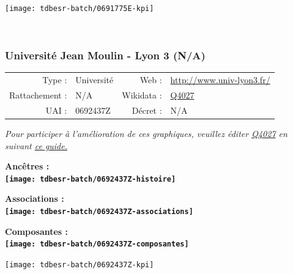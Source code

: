 \documentclass[12pt,french,]{article}
\begin{document}
\begin{center}\texttt{[image: tdbesr-batch/0691775E-kpi]} \end{center}\checkoddpage

\ifoddpage ~\newpage \fi   

\hypertarget{universituxe9-jean-moulin---lyon-3-na}{%
\subsubsection{Université Jean Moulin - Lyon 3
(N/A)}\label{universituxe9-jean-moulin---lyon-3-na}}

\begin{tabular*}{\textwidth}{rp{5cm}rl}  
\hline  
Type : & Université & Web : &\href{http://www.univ-lyon3.fr/}{http://www.univ-lyon3.fr/} \\  
Rattachement : & N/A & Wikidata : & \href{https://www.wikidata.org/entity/Q4027}{Q4027} \\  
UAI : & 0692437Z & Décret : & N/A \\  
\hline  
\end{tabular*}

\textit{\scriptsize Pour participer à l'amélioration de ces graphiques, veuillez éditer  \href{https://www.wikidata.org/entity/Q4027}{Q4027}  en suivant \href{https://github.com/cpesr/wikidataESR/blob/master/Rmd/wikidataESR.md}{ce guide.}}

\vspace{1cm}  
\begin{minipage}[b]{0.50\textwidth}\begin{center} \bf Ancêtres : \\  
\texttt{[image: tdbesr-batch/0692437Z-histoire]} \end{center}\end{minipage}\begin{minipage}[b]{0.50\textwidth}\begin{center} \bf Associations : \\  
\texttt{[image: tdbesr-batch/0692437Z-associations]} \end{center}\end{minipage}

\hrulefill

\begin{center} \bf Composantes : \\  
\texttt{[image: tdbesr-batch/0692437Z-composantes]} \end{center}

\begin{center}\texttt{[image: tdbesr-batch/0692437Z-kpi]} \end{center}\checkoddpage
\end{document}
